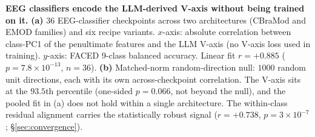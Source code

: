 \textbf{EEG classifiers encode the LLM-derived V-axis without
being trained on it.}
\textbf{(a)} $36$ EEG-classifier checkpoints across two architectures
(CBraMod and EMOD families) and six recipe variants. $x$-axis:
absolute correlation between class-PC1 of the penultimate features
and the LLM V-axis (no V-axis loss used in training). $y$-axis:
FACED 9-class balanced accuracy. Linear fit $r{=}{+}0.885$
($p{=}7.8\!\times\!10^{-13}$, $n{=}36$). \textbf{(b)} Matched-norm
random-direction null: $1000$ random unit directions, each with its
own across-checkpoint correlation. The V-axis sits at the $93.5$th
percentile (one-sided $p{=}0.066$, not beyond the null), and the pooled
fit in (a) does not hold within a single architecture. The within-class
residual alignment carries the statistically robust signal
($r{=}{+}0.738$, $p{=}3\!\times\!10^{-7}$; \S\ref{sec:convergence}).
